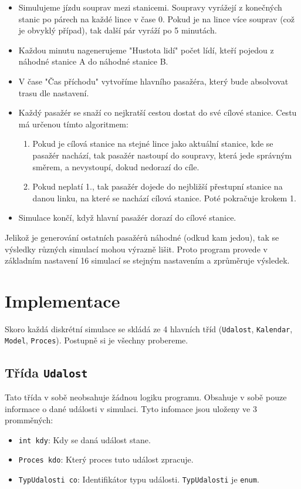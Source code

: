 \documentclass[12pt, a4paper]{article}
\begin{document}
\begin{itemize}
    \item Simulujeme jízdu souprav mezi stanicemi. Soupravy vyrážejí z konečných stanic po párech na každé lince v čase 0. Pokud je na lince více souprav (což je obvyklý případ), tak další pár vyráží po 5 minutách.
    \item Každou minutu nagenerujeme "Hustota lidí" počet lídí, kteří pojedou z náhodné stanice A do náhodné stanice B.
    \item V čase "Čas příchodu" vytvoříme hlavního pasažéra, který bude absolvovat trasu dle nastavení.
    \item Každý pasažér se snaží co nejkratší cestou dostat do své cílové stanice. Cestu má určenou tímto algoritmem:
        \begin{enumerate}
            \item Pokud je cílová stanice na stejné lince jako aktuální stanice, kde se pasažér nachází, tak pasažér nastoupí do soupravy, která jede správným směrem, a nevystoupí, dokud nedorazí do cíle.
            \item Pokud neplatí 1., tak pasažér dojede do nejbližší přestupní stanice na danou linku, na které se nachází cílová stanice. Poté pokračuje krokem 1.
        \end{enumerate} 
    \item Simulace končí, když hlavní pasažér dorazí do cílové stanice.
\end{itemize}

Jelikož je generování ostatních pasažérů náhodné (odkud kam jedou), tak se výsledky různých simulací mohou výrazně lišit. Proto program provede v základním nastavení 16 simulací se stejným nastavením a zprůměruje výsledek.

\section{Implementace}

Skoro každá diskrétní simulace se skládá ze 4 hlavních tříd (\texttt{Udalost}, \texttt{Kalendar}, \texttt{Model}, \texttt{Proces}). Postupně si je všechny probereme. 

\subsection{Třída \texttt{Udalost}}
Tato třída v sobě neobsahuje žádnou logiku programu. Obsahuje v sobě pouze informace o dané události v simulaci. Tyto infomace jsou uloženy ve 3 promměných:
\begin{itemize}
    \item \texttt{int kdy}: Kdy se daná událost stane.
    \item \texttt{Proces kdo}: Který proces tuto událost zpracuje.
    \item \texttt{TypUdalosti co}: Identifikátor typu události. \texttt{TypUdalosti} je \texttt{enum}.
\end{itemize}
\end{document}
